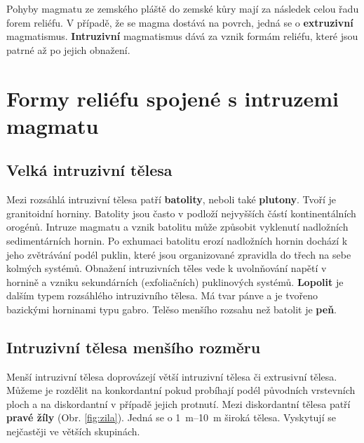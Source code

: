 Pohyby magmatu ze zemského pláště do zemské kůry mají za následek celou řadu forem reliéfu. V případě, že se magma dostává na povrch, jedná se o \textbf{extruzivní} magmatismus.  \textbf{Intruzivní} magmatismus dává za vznik formám reliéfu, které jsou patrné až po jejich obnažení.  

\section{Formy reliéfu spojené s intruzemi magmatu}
\subsection{Velká intruzivní tělesa}
Mezi rozsáhlá intruzivní tělesa patří \textbf{batolity}, neboli také \textbf{plutony}. Tvoří je granitoidní horniny. Batolity jsou často v podloží nejvyšších částí kontinentálních orogénů. Intruze magmatu a vznik batolitu může způsobit vyklenutí nadložních sedimentárních hornin. Po exhumaci batolitu erozí nadložních hornin dochází k jeho zvětrávání podél puklin, které jsou organizované zpravidla do třech na sebe kolmých systémů. Obnažení intruzivních těles vede k uvolnňování napětí v hornině a vzniku sekundárních (exfoliačních) puklinových systémů. \textbf{Lopolit} je dalším typem rozsáhlého intruzivního tělesa. Má tvar pánve a je tvořeno bazickými horninami typu gabro. Telěso menšího rozsahu než batolit je \textbf{peň}.

\subsection{Intruzivní tělesa menšího rozměru}
Menší intruzivní tělesa doprovázejí větší intruzivní tělesa či extrusivní tělesa. Můžeme je rozdělit na konkordantní pokud probíhají podél původních vrstevních ploch a na diskordantní v případě jejich protnutí. Mezi diskordantní tělesa patří \textbf{pravé žíly} (Obr. \ref{fig:zila}). Jedná se o \SIrange{1}{10}{\metre} široká tělesa. Vyskytují se nejčastěji ve větších skupinách.

